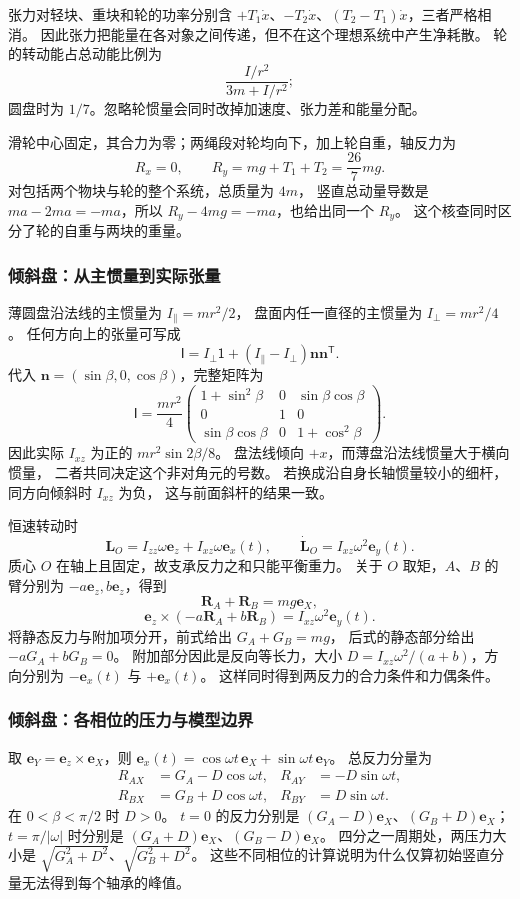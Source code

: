 \documentclass[UTF8,zihao=-4,fontset=fandol,a4paper]{ctexart}
\newcommand{\vect}[1]{\bm{#1}}
\begin{document}
张力对轻块、重块和轮的功率分别含
$+T_1\dot x$、$-T_2\dot x$、$(T_2-T_1)\dot x$，三者严格相消。
因此张力把能量在各对象之间传递，但不在这个理想系统中产生净耗散。
轮的转动能占总动能比例为
\[
\frac{I/r^2}{3m+I/r^2};
\]
圆盘时为 $1/7$。忽略轮惯量会同时改掉加速度、张力差和能量分配。

滑轮中心固定，其合力为零；两绳段对轮均向下，加上轮自重，轴反力为
\[
R_x=0,\qquad R_y=mg+T_1+T_2=\frac{26}{7}mg.
\]
对包括两个物块与轮的整个系统，总质量为 $4m$，
竖直总动量导数是 $ma-2ma=-ma$，所以
$R_y-4mg=-ma$，也给出同一个 $R_y$。
这个核查同时区分了轮的自重与两块的重量。

\subsubsection*{倾斜盘：从主惯量到实际张量}
薄圆盘沿法线的主惯量为 $I_\parallel=mr^2/2$，
盘面内任一直径的主惯量为 $I_\perp=mr^2/4$。
任何方向上的张量可写成
\[
\mathsf I=I_\perp\mathsf1
+(I_\parallel-I_\perp)\vect n\vect n^{\mathsf T}.
\]
代入 $\vect n=(\sin\beta,0,\cos\beta)$，完整矩阵为
\[
\mathsf I=\frac{mr^2}{4}
\begin{pmatrix}
1+\sin^2\beta&0&\sin\beta\cos\beta\\
0&1&0\\
\sin\beta\cos\beta&0&1+\cos^2\beta
\end{pmatrix}.
\]
因此实际 $I_{xz}$ 为正的 $mr^2\sin2\beta/8$。
盘法线倾向 $+x$，而薄盘沿法线惯量大于横向惯量，
二者共同决定这个非对角元的号数。
若换成沿自身长轴惯量较小的细杆，同方向倾斜时 $I_{xz}$ 为负，
这与前面斜杆的结果一致。

恒速转动时
\[
\vect L_O=I_{zz}\omega\vect e_z+I_{xz}\omega\vect e_x(t),
\qquad
\dot{\vect L}_O=I_{xz}\omega^2\vect e_y(t).
\]
质心 $O$ 在轴上且固定，故支承反力之和只能平衡重力。
关于 $O$ 取矩，$A$、$B$ 的臂分别为 $-a\vect e_z,b\vect e_z$，得到
\[
\vect R_A+\vect R_B=mg\vect e_X,
\]
\[
\vect e_z\times(-a\vect R_A+b\vect R_B)
=I_{xz}\omega^2\vect e_y(t).
\]
将静态反力与附加项分开，前式给出 $G_A+G_B=mg$，
后式的静态部分给出 $-aG_A+bG_B=0$。
附加部分因此是反向等长力，大小
$D=I_{xz}\omega^2/(a+b)$，方向分别为 $-\vect e_x(t)$ 与 $+\vect e_x(t)$。
这样同时得到两反力的合力条件和力偶条件。

\subsubsection*{倾斜盘：各相位的压力与模型边界}
取 $\vect e_Y=\vect e_z\times\vect e_X$，则
$\vect e_x(t)=\cos\omega t\,\vect e_X+\sin\omega t\,\vect e_Y$。
总反力分量为
\begin{align*}
R_{AX}&=G_A-D\cos\omega t,&R_{AY}&=-D\sin\omega t,\\
R_{BX}&=G_B+D\cos\omega t,&R_{BY}&=D\sin\omega t.
\end{align*}
在 $0<\beta<\pi/2$ 时 $D>0$。
$t=0$ 的反力分别是 $(G_A-D)\vect e_X$、$(G_B+D)\vect e_X$；
$t=\pi/|\omega|$ 时分别是 $(G_A+D)\vect e_X$、$(G_B-D)\vect e_X$。
四分之一周期处，两压力大小是 $\sqrt{G_A^2+D^2}$、$\sqrt{G_B^2+D^2}$。
这些不同相位的计算说明为什么仅算初始竖直分量无法得到每个轴承的峰值。
\end{document}
